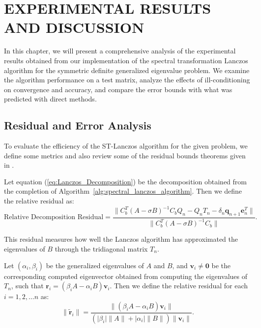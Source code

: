 \chapter{EXPERIMENTAL RESULTS AND DISCUSSION}

In this chapter, we will present a comprehensive analysis of the experimental results obtained from our implementation of the spectral transformation Lanczos algorithm for the symmetric definite generalized eigenvalue problem. We examine the algorithm performance on a test matrix, analyze the effects of ill-conditioning on convergence and accuracy, and compare the error bounds with what was predicted with direct methods.

\section{Residual and Error Analysis}

To evaluate the efficiency of the ST-Lanczos algorithm for the given problem, we define some metrics and also review some of the residual bounds theorems given in \cite{stewart2024spectraltransformationdensesymmetric}.

\begin{definition}\label{def:DecompositionResidual}
	Let equation (\ref{eq:Lanczos_Decomposition}) be the decomposition obtained from the completion of Algorithm~\ref{alg:spectral_lanczos_algorithm}. Then we define the relative residual as:
	\begin{equation}\label{eq:DecompositionResidual}
		\text{Relative Decomposition Residual} = \frac{\|C_b^T (A-\sigma B)^{-1} C_bQ_n - Q_nT_n - \delta_{n}\mathbf{q}_{n+1}\mathbf{e}_n^T\|}{\|C_b^T (A-\sigma B)^{-1} C_b\|}.
	\end{equation}
\end{definition}
This residual measures how well the Lanczos algorithm has approximated the eigenvalues of $B$ through the tridiagonal matrix $T_n$.

\begin{definition}\label{def:GeneralizedRelativeResidual}
	Let $(\alpha_i, \beta_i)$ be the generalized eigenvalues of $A$ and $B$, and $\mathbf{v}_i \neq \mathbf{0}$ be the corresponding computed eigenvector obtained from computing the eigenvalues of $T_n$, such that $\mathbf{r}_i = (\beta_i A - \alpha_i B)\mathbf{v}_i$. Then we define the relative residual for each $i = 1, 2, \ldots n$ as:
	\begin{equation}\label{eq:GeneralizedResidual}
		\|\tilde{\mathbf{r}}_i\| = \frac{\| (\beta_i A - \alpha_i B)\mathbf{v}_i \| }{(\lvert \beta_i \rvert \|A\| + \lvert \alpha_i \rvert \|B\|)\|\mathbf{v}_i\| }.
	\end{equation}
\end{definition}


